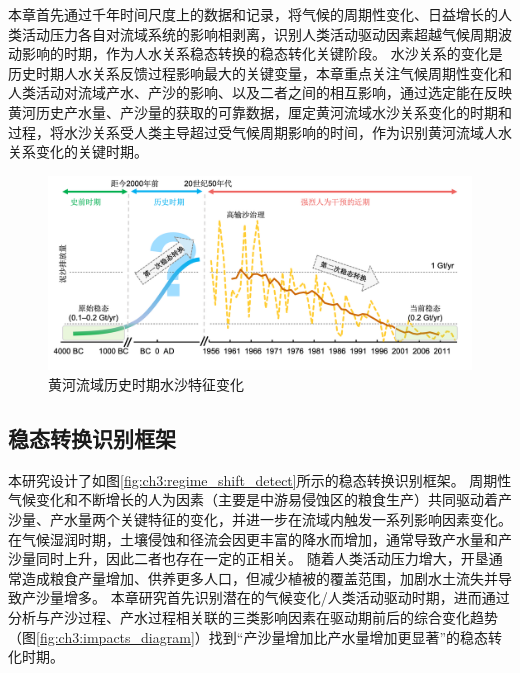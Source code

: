 
本章首先通过千年时间尺度上的数据和记录，将气候的周期性变化、日益增长的人类活动压力各自对流域系统的影响相剥离，识别人类活动驱动因素超越气候周期波动影响的时期，作为人水关系稳态转换的稳态转化关键阶段。
水沙关系的变化是历史时期人水关系反馈过程影响最大的关键变量，本章重点关注气候周期性变化和人类活动对流域产水、产沙的影响、以及二者之间的相互影响，通过选定能在反映黄河历史产水量、产沙量的获取的可靠数据，厘定黄河流域水沙关系变化的时期和过程，将水沙关系受人类主导超过受气候周期影响的时间，作为识别黄河流域人水关系变化的关键时期。

\begin{figure}[!htb] %
    \centering
    \includegraphics[width=\textwidth]{img/ch3/ch3_why_regime_shift.png}
    \caption{黄河流域历史时期水沙特征变化}\label{fig:ch3:why_regime_shift}
\end{figure}

\subsection{稳态转换识别框架}\label{sec:ch3:approach}

本研究设计了如图\ref{fig:ch3:regime_shift_detect}所示的稳态转换识别框架。
周期性气候变化和不断增长的人为因素（主要是中游易侵蚀区的粮食生产）共同驱动着产沙量、产水量两个关键特征的变化，并进一步在流域内触发一系列影响因素变化。
在气候湿润时期，土壤侵蚀和径流会因更丰富的降水而增加，通常导致产水量和产沙量同时上升，因此二者也存在一定的正相关\cite{GeQuanSheng2011}。
随着人类活动压力增大，开垦通常造成粮食产量增加、供养更多人口，但减少植被的覆盖范围，加剧水土流失并导致产沙量增多\cite{wu2020a}。
本章研究首先识别潜在的气候变化/人类活动驱动时期，进而通过分析与产沙过程、产水过程相关联的三类影响因素在驱动期前后的综合变化趋势（图\ref{fig:ch3:impacts_diagram}）找到“产沙量增加比产水量增加更显著”的稳态转化时期。

